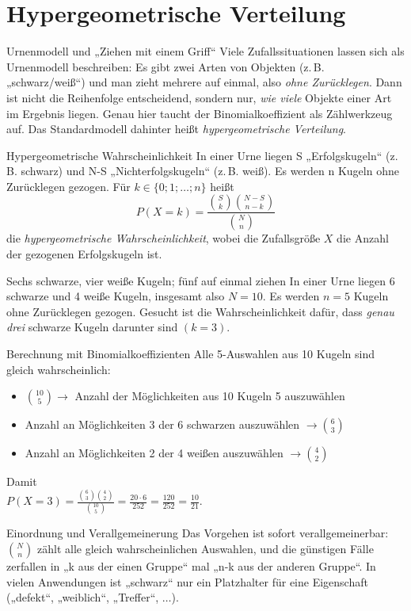 \section{Hypergeometrische Verteilung}
\begin{bem}{Urnenmodell und „Ziehen mit einem Griff“}{}
Viele Zufallssituationen lassen sich als Urnenmodell beschreiben: Es gibt zwei Arten von Objekten (z.\,B. „schwarz/weiß“) und man zieht mehrere auf einmal, also \emph{ohne Zurücklegen}. Dann ist nicht die Reihenfolge entscheidend, sondern nur, \emph{wie viele} Objekte einer Art im Ergebnis liegen. Genau hier taucht der Binomialkoeffizient als Zählwerkzeug auf. Das Standardmodell dahinter heißt \emph{hypergeometrische Verteilung}.
\end{bem}
\begin{defi}{Hypergeometrische Wahrscheinlichkeit}{}
In einer Urne liegen S „Erfolgskugeln“ (z.\,B. schwarz) und N-S „Nichterfolgskugeln“ (z.\,B. weiß). Es werden n Kugeln ohne Zurücklegen gezogen.
Für \(k\in\{0;1;\dots;n\}\) heißt
\[P(X=k)=\frac{\binom{S}{k}\binom{N-S}{n-k}}{\binom{N}{n}}\]
die \emph{hypergeometrische Wahrscheinlichkeit}, wobei die Zufallsgröße \(X\) die Anzahl der gezogenen Erfolgskugeln ist.
\end{defi}
\begin{bsp}{Sechs schwarze, vier weiße Kugeln; fünf auf einmal ziehen}{}
In einer Urne liegen 6 schwarze und 4 weiße Kugeln, insgesamt also \(N=10\). Es werden \(n=5\) Kugeln ohne Zurücklegen gezogen. Gesucht ist die Wahrscheinlichkeit dafür, dass \emph{genau drei} schwarze Kugeln darunter sind \((k=3)\).
\end{bsp}
\begin{rechnung}{Berechnung mit Binomialkoeffizienten}{}
Alle 5-Auswahlen aus 10 Kugeln sind gleich wahrscheinlich:\begin{itemize}
    \item \(\binom{10}{5} \longrightarrow\) Anzahl der Möglichkeiten aus 10 Kugeln 5 auszuwählen 
   \item  Anzahl an Möglichkeiten  3 der 6 schwarzen auszuwählen \(\longrightarrow \binom{6}{3}\)
    \item  Anzahl an Möglichkeiten 2 der 4 weißen auszuwählen \(\longrightarrow\binom{4}{2} \) 
\end{itemize}
Damit\\
\(P(X=3)=\frac{\binom{6}{3}\binom{4}{2}}{\binom{10}{5}}
=\frac{20\cdot 6}{252}
=\frac{120}{252}
=\frac{10}{21}\).
\end{rechnung}
\begin{bem}{Einordnung und Verallgemeinerung}{}
Das Vorgehen ist sofort verallgemeinerbar: \(\binom{N}{n}\) zählt alle gleich wahrscheinlichen Auswahlen, und die günstigen Fälle zerfallen in „k aus der einen Gruppe“ mal „n-k aus der anderen Gruppe“. In vielen Anwendungen ist „schwarz“ nur ein Platzhalter für eine Eigenschaft („defekt“, „weiblich“, „Treffer“, \(\dots\)).
\end{bem}
